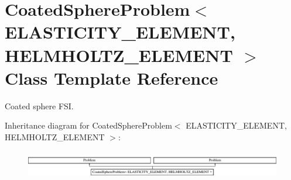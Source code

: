 \hypertarget{classCoatedSphereProblem}{}\section{Coated\+Sphere\+Problem$<$ E\+L\+A\+S\+T\+I\+C\+I\+T\+Y\+\_\+\+E\+L\+E\+M\+E\+NT, H\+E\+L\+M\+H\+O\+L\+T\+Z\+\_\+\+E\+L\+E\+M\+E\+NT $>$ Class Template Reference}
\label{classCoatedSphereProblem}


Coated sphere F\+SI.  


Inheritance diagram for Coated\+Sphere\+Problem$<$ E\+L\+A\+S\+T\+I\+C\+I\+T\+Y\+\_\+\+E\+L\+E\+M\+E\+NT, H\+E\+L\+M\+H\+O\+L\+T\+Z\+\_\+\+E\+L\+E\+M\+E\+NT $>$\+:\begin{figure}[H]
\begin{center}
\leavevmode
\includegraphics[height=1.225383cm]{classCoatedSphereProblem}
\end{center}
\end{figure}
